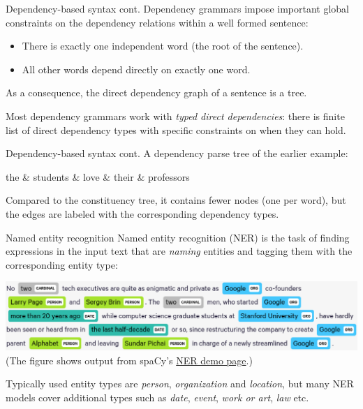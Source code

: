 \documentclass[style=upen, size=14pt]{powerdot}
\begin{document}
\begin{slide}[toc=]{Dependency-based syntax cont.}
  Dependency grammars impose important global constraints on the dependency
  relations within a well formed sentence:
  
  \begin{itemize}
  \item There is exactly one independent word (the root of the sentence).
  \item All other words depend directly on exactly one word.
  \end{itemize}
  As a consequence, the direct dependency graph of a sentence is a tree.

  Most dependency grammars work with \emph{typed direct dependencies}: there is
  finite list of direct dependency types with specific constraints on when they
  can hold.
\end{slide}

\begin{slide}[toc=]{Dependency-based syntax cont.}
  A dependency parse tree of the earlier example:
  \begin{center}
    \begin{dependency}[theme=simple, edge style={white}, label style={text=white}]
      \begin{deptext}[column sep=1em, nodes={text=white}]
        the \& students \& love \& their \& professors \\
      \end{deptext}
    \end{dependency}
  \end{center}
  Compared to the constituency tree, it contains fewer nodes (one per word), but
  the edges are labeled with the corresponding dependency types.
\end{slide}

\begin{slide}[toc=NER]{Named entity recognition}
  Named entity recognition (NER) is the task of finding expressions in the input
  text that are \emph{naming} entities and tagging them with the corresponding
  entity type: \bigskip

  \includegraphics[width=1.\textwidth]{ner.eps} {\footnotesize(The figure shows
    output from spaCy's \href{https://explosion.ai/demos/displacy-ent}{NER demo
      page}.)}\bigskip

  Typically used entity types are \emph{person}, \emph{organization} and
  \emph{location}, but many NER models cover additional types such
  as \emph{date}, \emph{event}, \emph{work or art}, \emph{law} etc.
\end{slide}
\end{document}
